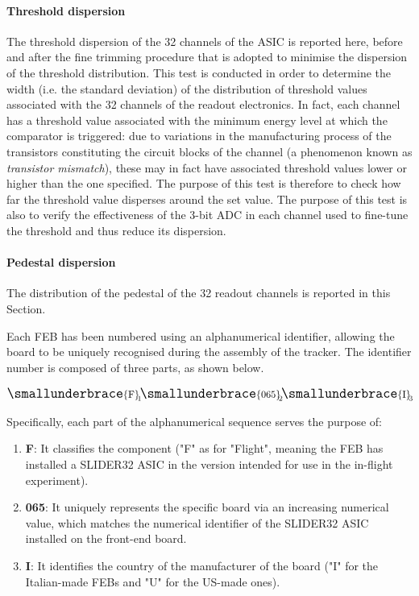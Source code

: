 \paragraph{Threshold dispersion} The threshold dispersion of the 32 channels of the ASIC is reported here, before and after the fine trimming procedure that is adopted to minimise the dispersion of the threshold distribution. This test is conducted in order to determine the width (i.e. the standard deviation) of the distribution of threshold values associated with the 32 channels of the readout electronics. In fact, each channel has a threshold value associated with the minimum energy level at which the comparator is triggered: due to variations in the manufacturing process of the transistors constituting the circuit blocks of the channel (a phenomenon known as \textit{transistor mismatch}), these may in fact have associated threshold values lower or higher than the one specified. The purpose of this test is therefore to check how far the threshold value disperses around the set value. The purpose of this test is also to verify the effectiveness of the 3-bit ADC in each channel used to fine-tune the threshold and thus reduce its dispersion.

\paragraph{Pedestal dispersion} The distribution of the pedestal of the 32 readout channels is reported in this Section.\\

\par
Each FEB has been numbered using an alphanumerical identifier, allowing the board to be uniquely recognised during the assembly of the tracker. The identifier number is composed of three parts, as shown below.

\begin{gather*}
    \Large
    \smallunderbrace{\mathrm{F}}_{\text{\clap{1}}} 
    \smallunderbrace{\mathrm{065}}_{\text{\clap{2}}}
    \smallunderbrace{\mathrm{I}}_{\text{\clap{3}}}
\end{gather*}

\noindent
Specifically, each part of the alphanumerical sequence serves the purpose of:

\begin{enumerate}
    \itemsep0em 
    \item \textbf{F}: It classifies the component ("F" as for "Flight", meaning the FEB has installed a SLIDER32 ASIC in the version intended for use in the in-flight experiment).
    \item \textbf{065}: It uniquely represents the specific board via an increasing numerical value, which matches the numerical identifier of the SLIDER32 ASIC installed on the front-end board.
    \item \textbf{I}: It identifies the country of the manufacturer of the board ("I" for the Italian-made FEBs and "U" for the US-made ones).
\end{enumerate}

